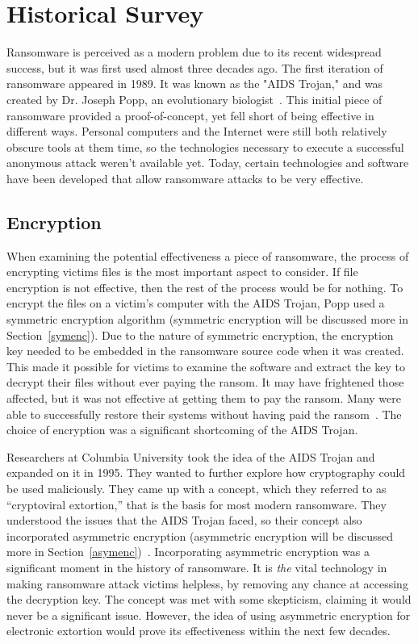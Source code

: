 \documentclass{IEEEtran}
\begin{document}
\section{Historical Survey}

Ransomware is perceived as a modern problem due to its recent widespread success, but it was first used almost three decades ago. The first iteration of ransomware appeared in 1989. It was known as the "AIDS Trojan," and was created by Dr. Joseph Popp, an evolutionary biologist~\cite{RN40}. This initial piece of ransomware provided a proof-of-concept, yet fell short of being effective in different ways. Personal computers and the Internet were still both relatively obscure tools at them time, so the technologies necessary to execute a successful anonymous attack weren't available yet. Today, certain technologies and software have been developed that allow ransomware attacks to be very effective.

\subsection{Encryption}\label{encryption}
When examining the potential effectiveness a piece of ransomware, the process of encrypting victims files is the most important aspect to consider. If file encryption is not effective, then the rest of the process would be for nothing. To encrypt the files on a victim's computer with the AIDS Trojan, Popp used a symmetric encryption algorithm (symmetric encryption will be discussed more in Section~\ref{symenc}). Due to the nature of symmetric encryption, the encryption key needed to be embedded in the ransomware source code when it was created. This made it possible for victims to examine the software and extract the key to decrypt their files without ever paying the ransom. It may have frightened those affected, but it was not effective at getting them to pay the ransom. Many were able to successfully restore their systems without having paid the ransom~\cite{RN40}. The choice of encryption was a significant shortcoming of the AIDS Trojan.

Researchers at Columbia University took the idea of the AIDS Trojan and expanded on it in 1995. They wanted to further explore how cryptography could be used maliciously. They came up with a concept, which they referred to as “cryptoviral extortion,” that is the basis for most modern ransomware. They understood the issues that the AIDS Trojan faced, so their concept also incorporated asymmetric encryption (asymmetric encryption will be discussed more in Section~\ref{asymenc})~\cite{RN24}. Incorporating asymmetric encryption was a significant moment in the history of ransomware. It is \textit{the} vital technology in making ransomware attack victims helpless, by removing any chance at accessing the decryption key. The concept was met with some skepticism, claiming it would never be a significant issue. However, the idea of using asymmetric encryption for electronic extortion would prove its effectiveness within the next few decades.
\end{document}
